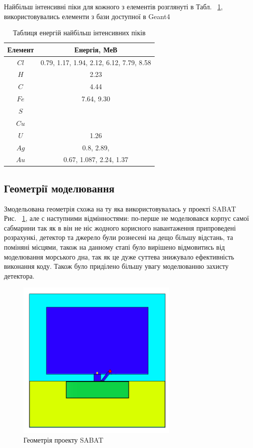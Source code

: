 \documentclass[a4paper, 14pt]{article}
\numberwithin{equation}{section}
\numberwithin{table}{section}
\begin{document}
Найбільш інтенсивні піки для кожного з елементів розглянуті в Табл. ~\ref{tabl:ElementsEnergy}, використовувались елементи з бази доступної в Geant4
\begin{table}[h]
\centering
	\begin{tabular}{|c|c|} 
		\hline
		Елемент& Енергія, МеВ \\
		\hline
		$Cl$ & 0.79, 1.17, 1.94, 2.12, 6.12, 7.79, 8.58 \\
		\hline
		$H$ & 2.23 \\
		\hline
		$C$ & 4.44 \\
		\hline
		$Fe$ & 7.64, 9.30 \\		
		\hline
		$S$ & \\
		\hline
		$Cu$ &  \\
		\hline
		$U$ & 1.26\\
		\hline
		$Ag$ &  0.8, 2.89, \\
		\hline
		$Au$ & 0.67, 1.087, 2.24, 1.37  \\
		
		\hline
	\end{tabular}
\caption{Таблиця енергій найбільш інтенсивних піків} 
\label{tabl:ElementsEnergy}
\end{table}

\subsection {Геометрії моделювання}
Змодельована геометрія схожа на ту яка використовувалась у проекті SABAT Рис. ~\ref{ris:SabatG}, але с наступними відмінностями: по-перше не моделювався корпус самої сабмарини так як в він не ніс жодного корисного навантаження припроведені розрахункі, детектор та джерело були рознесені на дещо більшу відстань, та поміняні місцями, також на данному єтапі було вирішено відмовитись від моделювання морського дна, так як це дуже суттева знижувало ефективність виконання коду. Також було приділено більшу увагу моделюванню захисту детектора.
\begin{figure}[hbt!]
	\centering \includegraphics[width=0.7\textwidth]{images/sabatGeometry.png}
	\caption{Геометрія проекту SABAT} 
	\label{ris:SabatG}	
\end{figure}
\end{document}

